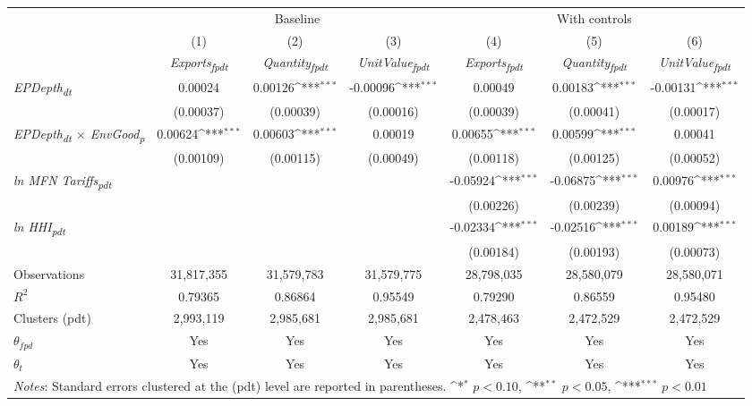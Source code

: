 {
\def\sym#1{\ifmmode^{#1}\else\(^{#1}\)\fi}
\begin{tabular}{l*{6}{c}}
\toprule
&\multicolumn{3}{c}{Baseline}&\multicolumn{3}{c}{With controls}\\\cmidrule(lr){2-4}\cmidrule(lr){5-7}
&(1)&(2)&(3)&(4)&(5)&(6)\\
&\textit{Exports\textsubscript{fpdt}}&\textit{Quantity\textsubscript{fpdt}}&\textit{UnitValue\textsubscript{fpdt}}&\textit{Exports\textsubscript{fpdt}}&\textit{Quantity\textsubscript{fpdt}}&\textit{UnitValue\textsubscript{fpdt}}\\
\midrule
\textit{EPDepth\textsubscript{dt}} & 0.00024 & 0.00126\sym{***} & -0.00096\sym{***} & 0.00049 & 0.00183\sym{***} & -0.00131\sym{***}\\
 & (0.00037) & (0.00039) & (0.00016) & (0.00039) & (0.00041) & (0.00017)\\
\addlinespace
\textit{EPDepth\textsubscript{dt} $\times$ EnvGood\textsubscript{p}} & 0.00624\sym{***} & 0.00603\sym{***} & 0.00019 & 0.00655\sym{***} & 0.00599\sym{***} & 0.00041\\
 & (0.00109) & (0.00115) & (0.00049) & (0.00118) & (0.00125) & (0.00052)\\
\addlinespace
\textit{ln MFN Tariffs\textsubscript{pdt}} &  &  &  & -0.05924\sym{***} & -0.06875\sym{***} & 0.00976\sym{***}\\
 &  &  &  & (0.00226) & (0.00239) & (0.00094)\\
\addlinespace
\textit{ln HHI\textsubscript{pdt}} &  &  &  & -0.02334\sym{***} & -0.02516\sym{***} & 0.00189\sym{***}\\
 &  &  &  & (0.00184) & (0.00193) & (0.00073)\\
\midrule
Observations & 31,817,355 & 31,579,783 & 31,579,775 & 28,798,035 & 28,580,079 & 28,580,071\\
$R^{2}$ & 0.79365 & 0.86864 & 0.95549 & 0.79290 & 0.86559 & 0.95480\\
Clusters (pdt) & 2,993,119 & 2,985,681 & 2,985,681 & 2,478,463 & 2,472,529 & 2,472,529\\
$\theta_{fpd}$ & Yes & Yes & Yes & Yes & Yes & Yes\\
$\theta_{t}$ & Yes & Yes & Yes & Yes & Yes & Yes\\
\bottomrule
\multicolumn{7}{l}{\footnotesize \textit{Notes}: Standard errors clustered at the (pdt) level are reported in parentheses. \sym{*} \(p<0.10\), \sym{**} \(p<0.05\), \sym{***} \(p<0.01\)}\\
\end{tabular}
}
